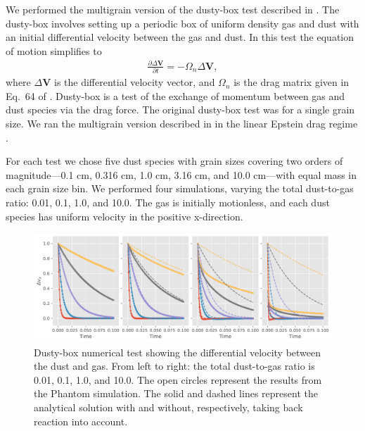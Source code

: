 \documentclass[fleqn,usenatbib]{mnras}
\let\vec\mathbf
\begin{document}
We performed the multigrain version of the dusty-box test described in
\citet{Laibe:2011}. The dusty-box involves setting up a periodic box of uniform
density gas and dust with an initial differential velocity between the gas and
dust. In this test the equation of motion simplifies to
%
\begin{align}
   \frac{\partial \Delta \vec{V}}{\partial t} = - \Omega_n \Delta \vec{V},
\end{align}
%
where $\Delta \vec{V}$ is the differential velocity vector, and $\Omega_n$ is
the drag matrix given in Eq.~64 of \citet{Laibe:2014}. Dusty-box is a test
of the exchange of momentum between gas and dust species via the drag force. The
original dusty-box test was for a single grain size. We ran the multigrain
version described in \citet{Laibe:2014} in the linear Epstein drag regime
\citep{Epstein:1924}.

For each test we chose five dust species with grain sizes covering two orders of
magnitude---0.1 cm, 0.316 cm, 1.0 cm, 3.16 cm, and 10.0 cm---with equal mass in
each grain size bin. We performed four simulations, varying the total
dust-to-gas ratio: 0.01, 0.1, 1.0, and 10.0. The gas is initially motionless,
and each dust species has uniform velocity in the positive x-direction.

\begin{figure}
   \begin{center}
      \includegraphics[width=\textwidth]{figs/delta_vx_Epstein.pdf}
      \caption{Dusty-box numerical test showing the differential velocity
         between the dust and gas. From left to right: the total dust-to-gas
         ratio is 0.01, 0.1, 1.0, and 10.0. The open circles represent the
         results from the Phantom simulation. The solid and dashed lines
         represent the analytical solution with and without, respectively,
         taking back reaction into account.\label{fig:dustybox-Epstein}}
   \end{center}
\end{figure}
\end{document}
